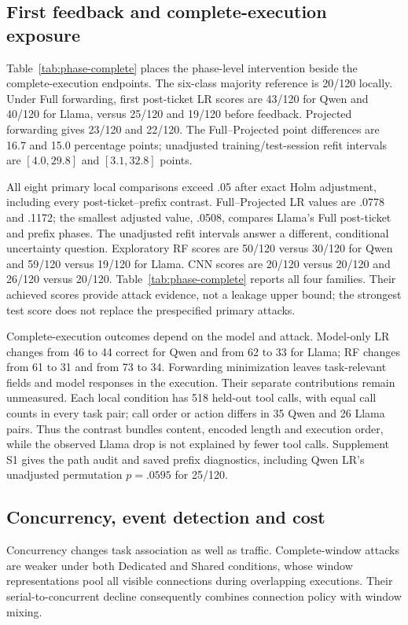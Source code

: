 \subsection{First feedback and complete-execution exposure}
Table~\ref{tab:phase-complete} places the phase-level intervention beside the complete-execution endpoints. The six-class majority reference is 20/120 locally. Under Full forwarding, first post-ticket LR scores are 43/120 for Qwen and 40/120 for Llama, versus 25/120 and 19/120 before feedback. Projected forwarding gives 23/120 and 22/120. The Full--Projected point differences are 16.7 and 15.0 percentage points; unadjusted training/test-session refit intervals are $[4.0,29.8]$ and $[3.1,32.8]$ points.

All eight primary local comparisons exceed .05 after exact Holm adjustment, including every post-ticket--prefix contrast. Full--Projected LR values are .0778 and .1172; the smallest adjusted value, .0508, compares Llama's Full post-ticket and prefix phases. The unadjusted refit intervals answer a different, conditional uncertainty question. Exploratory RF scores are 50/120 versus 30/120 for Qwen and 59/120 versus 19/120 for Llama. CNN scores are 20/120 versus 20/120 and 26/120 versus 20/120. Table~\ref{tab:phase-complete} reports all four families. Their achieved scores provide attack evidence, not a leakage upper bound; the strongest test score does not replace the prespecified primary attacks.



Complete-execution outcomes depend on the model and attack. Model-only LR changes from 46 to 44 correct for Qwen and from 62 to 33 for Llama; RF changes from 61 to 31 and from 73 to 34. Forwarding minimization leaves task-relevant fields and model responses in the execution. Their separate contributions remain unmeasured. Each local condition has 518 held-out tool calls, with equal call counts in every task pair; call order or action differs in 35 Qwen and 26 Llama pairs. Thus the contrast bundles content, encoded length and execution order, while the observed Llama drop is not explained by fewer tool calls. Supplement S1 gives the path audit and saved prefix diagnostics, including Qwen LR's unadjusted permutation $p=.0595$ for 25/120.

\subsection{Concurrency, event detection and cost}
Concurrency changes task association as well as traffic. Complete-window attacks are weaker under both Dedicated and Shared conditions, whose window representations pool all visible connections during overlapping executions. Their serial-to-concurrent decline consequently combines connection policy with window mixing.

